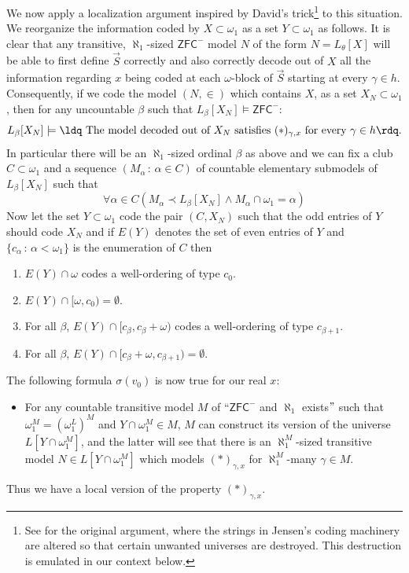 \documentclass[a4paper,11pt]{article}
\newcommand{\ZFCminus}{\mathsf{ZFC}^{-}}
\begin{document}
We now apply a localization argument inspired by David's trick\footnote{See \cite{David} for the original argument, where the strings in Jensen's coding machinery are altered so that certain unwanted universes are destroyed.  This destruction is emulated in our context below.} to this situation.  We reorganize the information coded by $X \subset \omega_1$ as a set $Y \subset \omega_1$ as follows.
It is clear that any transitive, $\aleph_1$-sized $\ZFCminus$ model $N$ of the form $N=L_{\theta}[X]$  will be able to first define $\vec{S}$ correctly  and also correctly decode out of $X$ all the information regarding $x$ being coded at each $\omega$-block of $\vec{S}$ starting at every $\gamma \in h$. 
Consequently, if we code the model $(N,\in)$ which contains $X$, as a set $X_N \subset \omega_1$, then for any uncountable $\beta$ such that $L_{\beta}[X_N] \models \ZFCminus$:
\[L_{\beta}[X_N] \models \text{\ldq The model decoded out of }X_N \text{ satisfies $(\ast)_{\gamma,x}$ for every $\gamma \in h$\rdq.} \]
In particular there will be an $\aleph_1$-sized ordinal $\beta$ as above and we can fix a club $C \subset \omega_1$ and a sequence $(M_{\alpha} \, : \, \alpha \in C)$ of countable elementary submodels  of $L_{\beta} [X_N]$ such that
\[\forall \alpha \in C (M_{\alpha} \prec L_{\beta}[X_N] \land M_{\alpha} \cap \omega_1 = \alpha)\]
Now let the set $Y\subset \omega_1$ code the pair $(C, X_N)$ such that the odd entries of $Y$ should code $X_N$ and if $E(Y)$ denotes  the set of even entries of $Y$ and $\{c_{\alpha} \, : \, \alpha < \omega_1\}$ is the enumeration of $C$ then
\begin{enumerate}
\item $E(Y) \cap \omega$ codes a well-ordering of type $c_0$.
\item $E(Y) \cap [\omega, c_0) = \emptyset$.
\item For all $\beta$, $E(Y) \cap [c_{\beta}, c_{\beta} + \omega)$ codes a well-ordering of type $c_{\beta+1}$.
\item For all $\beta$, $E(Y) \cap [c_{\beta}+\omega, c_{\beta+1})= \emptyset$.
\end{enumerate}
The following formula $\sigma(v_0)$ is now true for our real $x$:
\begin{itemize}
\item[$\sigma(x) \equiv$] For any countable transitive model $M$ of  ``$\ZFCminus$ and $\aleph_1$ exists$"$ such that $\omega_1^M=(\omega_1^L)^M$ and $ Y \cap \omega_1^M \in M$, $M$ can construct its version of the universe $L[Y \cap \omega_1^M]$, and the latter will see that there is an $\aleph_1^M$-sized transitive model $N \in L[Y \cap \omega_1^M]$ which models $(\ast)_{\gamma,x}$ for $\aleph_1^M$-many $\gamma \in M$.
\end{itemize}
Thus we have a local version of the property $(\ast)_{\gamma,x}$.
\end{document}
